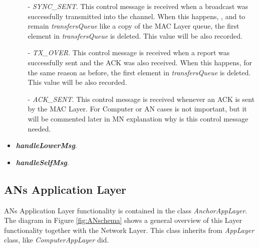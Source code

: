 \begin{itemize}
\begin{itemize}
    \item[-] \textit{SYNC\_SENT}. This control message is received when a broadcast was successfully transmitted into the channel. When this happens,
    , and to remain \textit{transfersQueue} like a copy of the \ac{MAC} Layer queue, the first element in \textit{transfersQueue} is deleted. This 
    value will be also recorded.

    \item[-] \textit{TX\_OVER}. This control message is received when a report was successfully sent and the \ac{ACK} was also received. When this 
    happens, for the same reason as before, the first element in \textit{transfersQueue} is deleted. This value will be also recorded.

    \item[-] \textit{ACK\_SENT}. This control message is received whenever an \ac{ACK} is sent by the \ac{MAC} Layer. For Computer or \ac{AN} cases 
    is not important, but it will be commented later in \ac{MN} explanation why is this control message needed.
  \end{itemize}


 \item \textbf{\textit{handleLowerMsg}}.

 \item \textbf{\textit{handleSelfMsg}}.


\end{itemize}


\subsection{\acp{AN} Application Layer}

\acp{AN} Application Layer functionality is contained in the class \textit{AnchorAppLayer}. The diagram in Figure \ref{fig:ANschema} 
shows a general overview of this Layer functionality together with the Network Layer. This class inherits from \textit{AppLayer} class, like
\textit{ComputerAppLayer} did.

